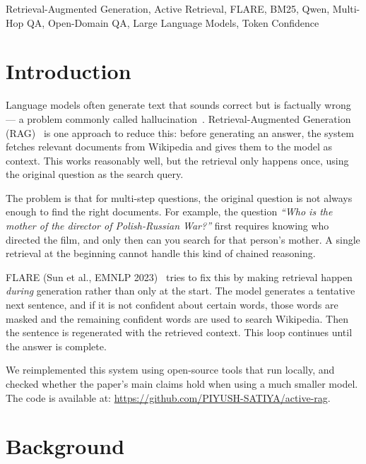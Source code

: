 \documentclass[conference]{IEEEtran}
\begin{document}
\begin{IEEEkeywords}
Retrieval-Augmented Generation, Active Retrieval, FLARE,
BM25, Qwen, Multi-Hop QA, Open-Domain QA, Large Language Models,
Token Confidence
\end{IEEEkeywords}

\section{Introduction}
\label{sec:intro}

Language models often generate text that sounds correct but is
factually wrong — a problem commonly called hallucination~\cite{ji2023hallucination}.
Retrieval-Augmented Generation (RAG)~\cite{lewis2020rag} is one
approach to reduce this: before generating an answer, the system
fetches relevant documents from Wikipedia and gives them to the model
as context. This works reasonably well, but the retrieval only happens
once, using the original question as the search query.

The problem is that for multi-step questions, the original question is
not always enough to find the right documents. For example, the question
\emph{``Who is the mother of the director of Polish-Russian War?''} first
requires knowing who directed the film, and only then can you search
for that person's mother. A single retrieval at the beginning cannot
handle this kind of chained reasoning.

FLARE (Sun et al., EMNLP 2023)~\cite{sun2023flare} tries to fix this by
making retrieval happen \emph{during} generation rather than only
at the start. The model generates a tentative next sentence, and if it
is not confident about certain words, those words are masked and the
remaining confident words are used to search Wikipedia. Then the
sentence is regenerated with the retrieved context. This loop
continues until the answer is complete.

We reimplemented this system using open-source tools that run locally,
and checked whether the paper's main claims hold when using a much
smaller model. The code is available at:
\url{https://github.com/PIYUSH-SATIYA/active-rag}.

\section{Background}
\label{sec:background}
\end{document}
